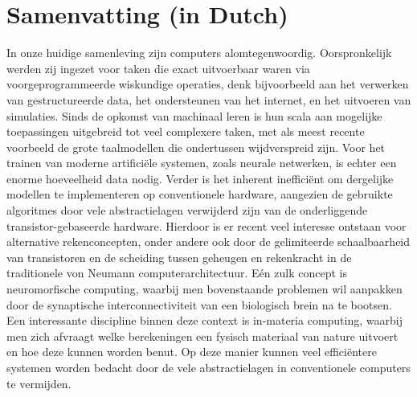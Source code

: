 \chapter*{Samenvatting (in Dutch)}
In onze huidige samenleving zijn computers alomtegenwoordig.
Oorspronkelijk werden zij ingezet voor taken die exact uitvoerbaar waren via voorgeprogrammeerde wiskundige operaties, denk bijvoorbeeld aan het verwerken van gestructureerde data, het ondersteunen van het internet, en het uitvoeren van simulaties.
Sinds de opkomst van machinaal leren is hun scala aan mogelijke toepassingen uitgebreid tot veel complexere taken, met als meest recente voorbeeld de grote taalmodellen die ondertussen wijdverspreid zijn.
Voor het trainen van moderne artifici\"ele systemen, zoals neurale netwerken, is echter een enorme hoeveelheid data nodig.
Verder is het inherent ineffici\"ent om dergelijke modellen te implementeren op conventionele hardware, aangezien de gebruikte algoritmes door vele abstractielagen verwijderd zijn van de onderliggende transistor-gebaseerde hardware.
Hierdoor is er recent veel interesse ontstaan voor alternative rekenconcepten, onder andere ook door de gelimiteerde schaalbaarheid van transistoren en de scheiding tussen geheugen en rekenkracht in de traditionele von Neumann computerarchitectuur.
E\'en zulk concept is neuromorfische computing, waarbij men bovenstaande problemen wil aanpakken door de synaptische interconnectiviteit van een biologisch brein na te bootsen.
Een interessante discipline binnen deze context is in-materia computing, waarbij men zich afvraagt welke berekeningen een fysisch materiaal van nature uitvoert en hoe deze kunnen worden benut.
Op deze manier kunnen veel effici\"entere systemen worden bedacht door de vele abstractielagen in conventionele computers te vermijden. \\ %

